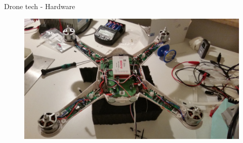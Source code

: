 \documentclass[aspectratio=169]{beamer}
\begin{document}
\begin{frame}{Drone tech - Hardware}
	\begin{figure}
		\includegraphics[width=0.9\linewidth]{images/qrx350pro_disassembled.jpg}
	\end{figure}
\end{frame}
\end{document}
